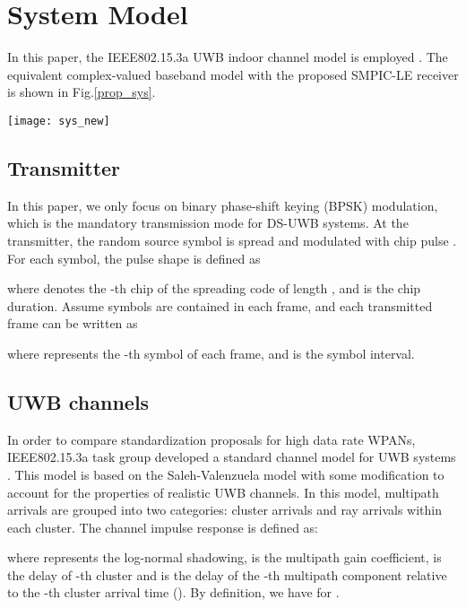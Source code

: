 \documentclass[journal]{IEEEtran}
\begin{document}
\section{System Model}
In this paper, the IEEE802.15.3a UWB indoor channel model is
employed \cite{Channel}. The equivalent complex-valued baseband
model with the proposed SMPIC-LE receiver is shown in
Fig.\ref{prop_sys}.

\begin{figure*}[t]
\begin{center}
  \texttt{[image: sys\_new]}
  \caption{Diagram of the DS-UWB System model with the SMPIC-LE receiver}
  \label{prop_sys}
\end{center}
\end{figure*}

\subsection{Transmitter}
In this paper, we only focus on binary phase-shift keying (BPSK)
modulation, which is the mandatory transmission mode for DS-UWB
systems. At the transmitter, the random source symbol is spread and
modulated with chip pulse . For each symbol, the pulse shape
is defined as

where  denotes the -th chip of the spreading code of length
, and  is the chip duration. Assume  symbols are
contained in each frame, and each transmitted frame can be written
as

where  represents the -th symbol of each frame,
and  is the symbol interval.

\subsection{UWB channels}
In order to compare standardization proposals for high data rate
WPANs, IEEE802.15.3a task group developed a standard channel model
for UWB systems \cite{Channel}. This model is based on the
Saleh-Valenzuela model \cite{S-V} with some modification to account
for the properties of realistic UWB channels. In this model,
multipath arrivals are grouped into two categories: cluster arrivals
and ray arrivals within each cluster. The channel impulse response
is defined as:

where  represents the log-normal shadowing,  is the
multipath gain coefficient,  is the delay of -th cluster and
 is the delay of the -th multipath component relative
to the -th cluster arrival time (). By definition, we have
 for .
\end{document}
